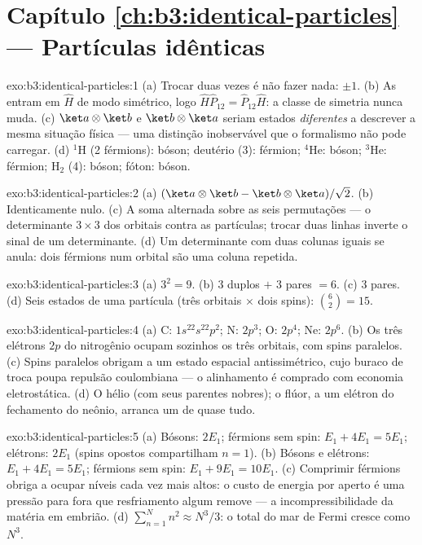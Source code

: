 \section*{Capítulo \ref{ch:b3:identical-particles} --- Partículas idênticas}

\begin{solution}{exo:b3:identical-particles:1}
(a) Trocar duas vezes é não fazer nada:  $\pm1$. (b) As
 entram em $\hat H$ de modo simétrico, logo $\hat H\hat
P_{12} = \hat P_{12}\hat H$: a classe de simetria nunca muda. (c)
$\ket a\otimes\ket b$ e $\ket b\otimes\ket a$ seriam estados
\emph{diferentes} a descrever a mesma situação física --- uma distinção
inobservável que o formalismo não pode carregar. (d)
$^1$H (2 férmions): bóson; deutério (3): férmion; $^4$He: bóson;
$^3$He: férmion; H$_2$ (4): bóson; fóton: bóson.
\end{solution}

\begin{solution}{exo:b3:identical-particles:2}
(a) $(\ket a\otimes\ket b - \ket b\otimes\ket a)/\sqrt2$. (b)
Identicamente nulo. (c) A soma alternada sobre as seis permutações ---
o determinante $3\times3$ dos orbitais contra as partículas; trocar
duas linhas inverte o sinal de um determinante. (d) Um determinante com
duas colunas iguais se anula: dois férmions num orbital são uma coluna
repetida.
\end{solution}

\begin{solution}{exo:b3:identical-particles:3}
(a) $3^2 = 9$. (b) $3$ duplos $+$ $3$ pares $= 6$. (c) $3$ pares.
(d) Seis estados de uma partícula (três orbitais $\times$ dois spins):
$\binom62 = 15$.
\end{solution}

\begin{solution}{exo:b3:identical-particles:4}
(a) C: $1s^22s^22p^2$; N: $2p^3$; O: $2p^4$; Ne: $2p^6$. (b) Os três
elétrons $2p$ do nitrogênio ocupam sozinhos os três orbitais, com spins
paralelos. (c) Spins paralelos obrigam a um estado espacial
antissimétrico, cujo buraco de troca poupa repulsão coulombiana --- o
alinhamento é comprado com economia eletrostática. (d) O hélio (com
seus parentes nobres); o flúor, a um elétron do fechamento do neônio,
arranca um de quase tudo.
\end{solution}

\begin{solution}{exo:b3:identical-particles:5}
(a) Bósons: $2E_1$; férmions sem spin: $E_1 + 4E_1 = 5E_1$; elétrons:
$2E_1$ (spins opostos compartilham $n = 1$). (b) Bósons e elétrons:
$E_1 + 4E_1 = 5E_1$; férmions sem spin: $E_1 + 9E_1 =
10E_1$. (c) Comprimir férmions obriga a ocupar níveis cada vez mais
altos: o custo de energia por aperto é uma pressão para fora que
resfriamento algum remove --- a incompressibilidade da matéria em
embrião. (d) $\sum_{n=1}^N n^2 \approx N^3/3$: o total do mar de Fermi
cresce como $N^3$.
\end{solution}

